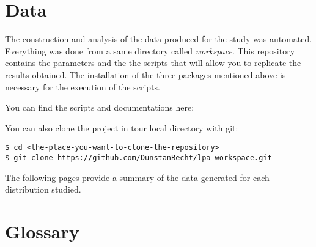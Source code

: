 \begin{appendix}

\section{Data}\label{sec:data}

The construction and analysis of the data produced for the study was automated.
Everything was done from a same directory called \textit{workspace}.
This repository contains the parameters and the the scripts that will allow you to replicate the results obtained.
The installation of the three packages mentioned above is necessary for the execution of the scripts.

\bigskip

You can find the scripts and documentations here: 

\bigskip

You can also clone the project in tour local directory with git:

\begin{tcolorbox}[width=\linewidth, title=shell]
\begin{verbatim}
$ cd <the-place-you-want-to-clone-the-repository>
$ git clone https://github.com/DunstanBecht/lpa-workspace.git
\end{verbatim}
\end{tcolorbox}

\bigskip

The following pages provide a summary of the data generated for each distribution studied.

\newpage

\begin{multicols}{2}



\null

\end{multicols}

\section{Glossary}

\printnoidxglossaries

\printbibliography[heading=bibintoc, heading=bibnumbered]

\end{appendix}
